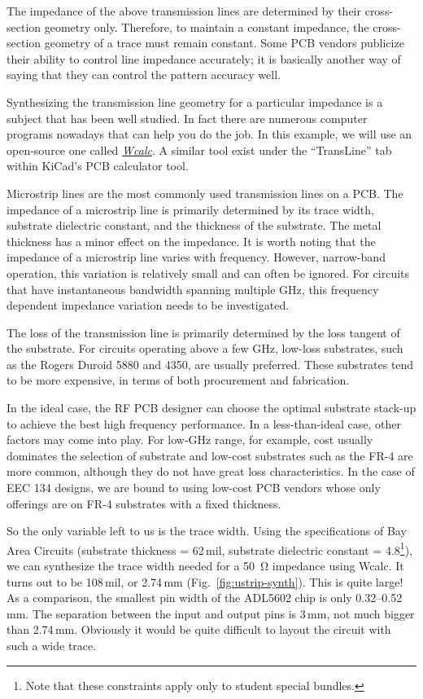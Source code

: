 \documentclass[12pt,letterpaper]{scrartcl}
\begin{document}
The impedance of the above transmission lines are determined by their cross-section geometry only. Therefore, to maintain a constant impedance, the cross-section geometry of a trace must remain constant. Some PCB vendors publicize their ability to control line impedance accurately; it is basically another way of saying that they can control the pattern accuracy well. 

Synthesizing the transmission line geometry for a particular impedance is a subject that has been well studied. In fact there are numerous computer programs nowadays that can help you do the job. In this example, we will use an open-source one called \href{http://wcalc.sourceforge.net/}{\textit{Wcalc}}. A similar tool exist under the ``TransLine'' tab within KiCad's PCB calculator tool. 

Microstrip lines are the most commonly used transmission lines on a PCB. The impedance of a microstrip line is primarily determined by its trace width, substrate dielectric constant, and the thickness of the substrate. The metal thickness has a minor effect on the impedance. It is worth noting that the impedance of a microstrip line varies with frequency. However, narrow-band operation, this variation is relatively small and can often be ignored. For circuits that have instantaneous bandwidth spanning multiple GHz, this frequency dependent impedance variation needs to be investigated.  

The loss of the transmission line is primarily determined by the loss tangent of the substrate. For circuits operating above a few GHz, low-loss substrates, such as the Rogers Duroid 5880 and 4350, are usually preferred. These substrates tend to be more expensive, in terms of both procurement and fabrication. 

In the ideal case, the RF PCB designer can choose the optimal substrate stack-up to achieve the best high frequency performance. In a less-than-ideal case, other factors may come into play. For low-GHz range, for example, cost usually dominates the selection of substrate and low-cost substrates such as the FR-4 are more common, although they do not have great loss characteristics. In the case of EEC 134 designs, we are bound to using low-cost PCB vendors whose only offerings are on FR-4 substrates with a fixed thickness. 

So the only variable left to us is the trace width. Using the specifications of Bay Area Circuits (substrate thickness = 62\,mil, substrate dielectric constant = 4.8\footnote{Note that these constraints apply only to student special bundles.}), we can synthesize the trace width needed for a \SI{50}{\ohm} impedance using Wcalc. It turns out to be 108\,mil, or 2.74\,mm (Fig.~\ref{fig:ustrip-synth}). This is quite large! As a comparison, the smallest pin width of the ADL5602 chip is only 0.32--0.52\,mm. The separation between the input and output pins is 3\,mm, not much bigger than 2.74\,mm. Obviously it would be quite difficult to layout the circuit with such a wide trace. 
\end{document}
